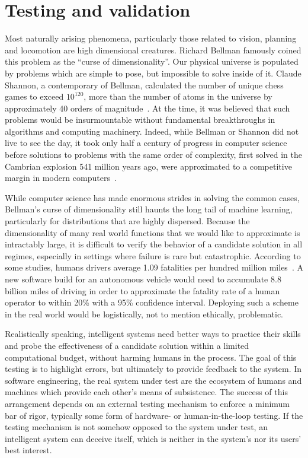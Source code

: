 \documentclass[12pt,initial,twoside,maitrise]{dms}
\numberwithin{equation}{section}
\numberwithin{table}{chapter}
\numberwithin{figure}{chapter}
\begin{document}
\section{Testing and validation}

Most naturally arising phenomena, particularly those related to vision, planning and locomotion are high dimensional creatures. Richard Bellman famously coined this problem as the ``curse of dimensionality''. Our physical universe is populated by problems which are simple to pose, but impossible to solve inside of it. Claude Shannon, a contemporary of Bellman, calculated the number of unique chess games to exceed $10^{120}$, more than the number of atoms in the universe by approximately 40 orders of magnitude~\citep{shannon1950chess}. At the time, it was believed that such problems would be insurmountable without fundamental breakthroughs in algorithms and computing machinery. Indeed, while Bellman or Shannon did not live to see the day, it took only half a century of progress in computer science before solutions to problems with the same order of complexity, first solved in the Cambrian explosion 541 million years ago, were approximated to a competitive margin in modern computers~\citep{pratt2015cambrian}.

While computer science has made enormous strides in solving the common cases, Bellman's curse of dimensionality still haunts the long tail of machine learning, particularly for distributions that are highly dispersed. Because the dimensionality of many real world functions that we would like to approximate is intractably large, it is difficult to verify the behavior of a candidate solution in all regimes, especially in settings where failure is rare but catastrophic. According to some studies, humans drivers average 1.09 fatalities per hundred million miles~\citep{kalra2016driving}. A new software build for an autonomous vehicle would need to accumulate 8.8 billion miles of driving in order to approximate the fatality rate of a human operator to within 20\% with a 95\% confidence interval. Deploying such a scheme in the real world would be logistically, not to mention ethically, problematic.

Realistically speaking, intelligent systems need better ways to practice their skills and probe the effectiveness of a candidate solution within a limited computational budget, without harming humans in the process. The goal of this testing is to highlight errors, but ultimately to provide feedback to the system. In software engineering, the real system under test are the ecosystem of humans and machines which provide each other's means of subsistence. The success of this arrangement depends on an external testing mechanism to enforce a minimum bar of rigor, typically some form of hardware- or human-in-the-loop testing. If the testing mechanism is not somehow opposed to the system under test, an intelligent system can deceive itself, which is neither in the system's nor its users' best interest.
\end{document}
